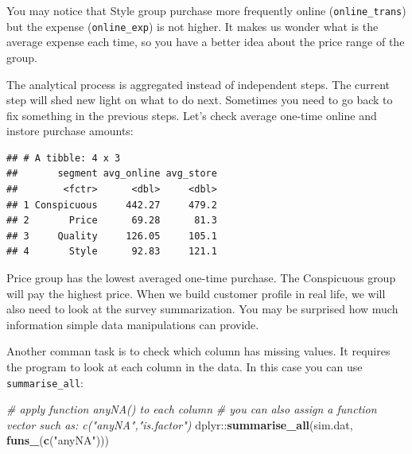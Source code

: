 \documentclass[12pt,]{krantz}
\newenvironment{Shaded}{\begin{snugshade}}{\end{snugshade}}
\newcommand{\KeywordTok}[1]{\textcolor[rgb]{0.13,0.29,0.53}{\textbf{{#1}}}}
\newcommand{\DataTypeTok}[1]{\textcolor[rgb]{0.13,0.29,0.53}{{#1}}}
\newcommand{\DecValTok}[1]{\textcolor[rgb]{0.00,0.00,0.81}{{#1}}}
\newcommand{\StringTok}[1]{\textcolor[rgb]{0.31,0.60,0.02}{{#1}}}
\newcommand{\CommentTok}[1]{\textcolor[rgb]{0.56,0.35,0.01}{\textit{{#1}}}}
\newcommand{\NormalTok}[1]{{#1}}
\theoremstyle{definition}
\theoremstyle{definition}
\theoremstyle{remark}
\begin{document}
You may notice that Style group purchase more frequently online
(\texttt{online\_trans}) but the expense (\texttt{online\_exp}) is not
higher. It makes us wonder what is the average expense each time, so you
have a better idea about the price range of the group.

The analytical process is aggregated instead of independent steps. The
current step will shed new light on what to do next. Sometimes you need
to go back to fix something in the previous steps. Let's check average
one-time online and instore purchase amounts:

\begin{Shaded}
\end{Shaded}

\begin{verbatim}
## # A tibble: 4 x 3
##       segment avg_online avg_store
##        <fctr>      <dbl>     <dbl>
## 1 Conspicuous     442.27     479.2
## 2       Price      69.28      81.3
## 3     Quality     126.05     105.1
## 4       Style      92.83     121.1
\end{verbatim}

Price group has the lowest averaged one-time purchase. The Conspicuous
group will pay the highest price. When we build customer profile in real
life, we will also need to look at the survey summarization. You may be
surprised how much information simple data manipulations can provide.

Another comman task is to check which column has missing values. It
requires the program to look at each column in the data. In this case
you can use \texttt{summarise\_all}:

\begin{Shaded}
\begin{Highlighting}[]
\CommentTok{# apply function anyNA() to each column}
\CommentTok{# you can also assign a function vector such as: c("anyNA","is.factor")}
\NormalTok{dplyr::}\KeywordTok{summarise_all}\NormalTok{(sim.dat, }\KeywordTok{funs_}\NormalTok{(}\KeywordTok{c}\NormalTok{(}\StringTok{"anyNA"}\NormalTok{)))}
\end{Highlighting}
\end{Shaded}
\end{document}
